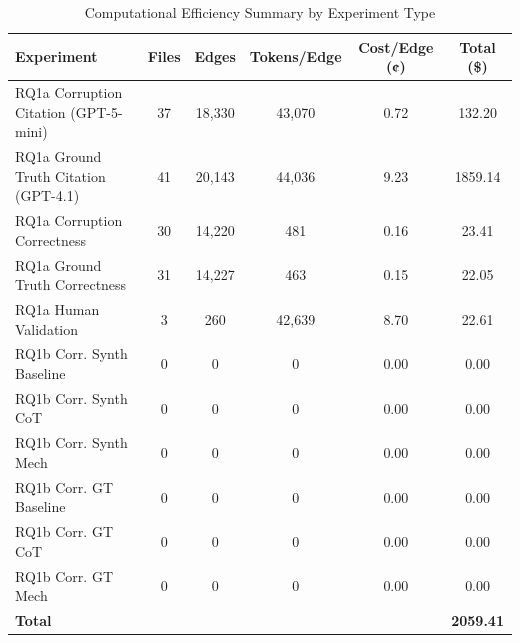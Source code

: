 \begin{table}[H]
\centering
\caption{Computational Efficiency Summary by Experiment Type}
\label{tab:cost_by_experiment}
\begin{tabular}{lccccc}
\toprule
\textbf{Experiment} & \textbf{Files} & \textbf{Edges} & \textbf{Tokens/Edge} & \textbf{Cost/Edge (¢)} & \textbf{Total (\$)} \\
\midrule
RQ1a Corruption Citation (GPT-5-mini) & 37 & 18,330 & 43,070 & 0.72 & 132.20 \\
RQ1a Ground Truth Citation (GPT-4.1) & 41 & 20,143 & 44,036 & 9.23 & 1859.14 \\
RQ1a Corruption Correctness & 30 & 14,220 & 481 & 0.16 & 23.41 \\
RQ1a Ground Truth Correctness & 31 & 14,227 & 463 & 0.15 & 22.05 \\
RQ1a Human Validation & 3 & 260 & 42,639 & 8.70 & 22.61 \\
RQ1b Corr. Synth Baseline & 0 & 0 & 0 & 0.00 & 0.00 \\
RQ1b Corr. Synth CoT & 0 & 0 & 0 & 0.00 & 0.00 \\
RQ1b Corr. Synth Mech & 0 & 0 & 0 & 0.00 & 0.00 \\
RQ1b Corr. GT Baseline & 0 & 0 & 0 & 0.00 & 0.00 \\
RQ1b Corr. GT CoT & 0 & 0 & 0 & 0.00 & 0.00 \\
RQ1b Corr. GT Mech & 0 & 0 & 0 & 0.00 & 0.00 \\
\midrule
\textbf{Total} & & & & & \textbf{2059.41} \\
\bottomrule
\end{tabular}
\end{table}